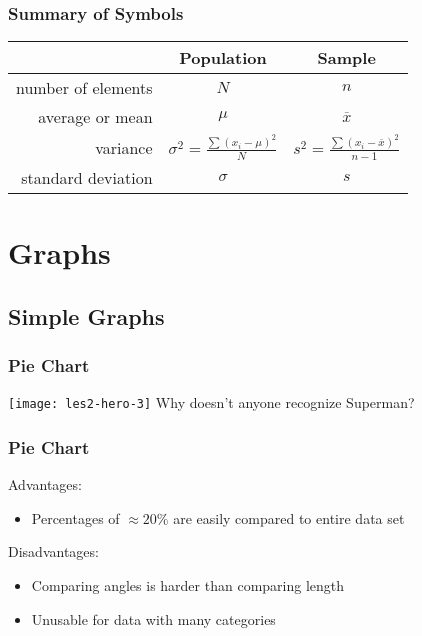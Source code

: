 \documentclass[aspectratio=169]{beamer}
\begin{document}
\begin{frame}
  \frametitle{Summary of Symbols}
  
  {\tabulinesep=1.2mm
    \begin{center}
      \begin{tabular}{rcc}
      	\toprule
      	                  & \textbf{Population} & \textbf{Sample}    \\
      	\midrule
       number of elements &        $N$         &         $n$         \\
          average or mean &       $\mu$        &   $\overline{x}$    \\
      	         variance & $\sigma^2 = \frac{\sum (x_i-\mu)^2}{N}$ & $s^2  = \frac{\sum (x_i-\overline{x})^2}{n-1}$ \\
       standard deviation &      $\sigma$      &         $s$         \\
      	\bottomrule
      \end{tabular}
    \end{center}
  }
\end{frame}

\section{Graphs}

\subsection{Simple Graphs}

\begin{frame}
  \frametitle{Pie Chart}
  
  \centering
  \texttt{[image: les2-hero-3]}
  Why doesn't anyone recognize Superman?
  
\end{frame}

\begin{frame}
  \frametitle{Pie Chart}
  
  Advantages:
  \begin{itemize}
    \item Percentages of $\approx20\%$ are easily compared to entire data set
  \end{itemize}
  Disadvantages:
  \begin{itemize}
    \item Comparing angles is harder than comparing length
    \item Unusable for data with many categories
  \end{itemize}
\end{frame}
\end{document}

